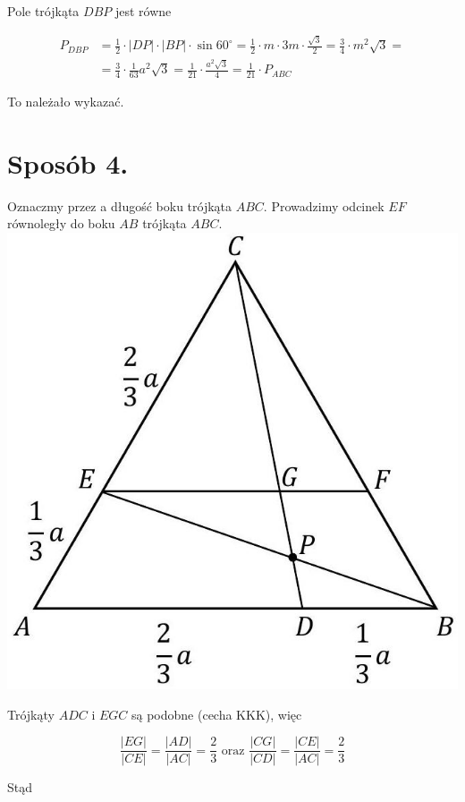 \documentclass[10pt]{article}
\begin{document}
Pole trójkąta $D B P$ jest równe

$$
\begin{aligned}
P_{D B P} & =\frac{1}{2} \cdot|D P| \cdot|B P| \cdot \sin 60^{\circ}=\frac{1}{2} \cdot m \cdot 3 m \cdot \frac{\sqrt{3}}{2}=\frac{3}{4} \cdot m^{2} \sqrt{3}= \\
& =\frac{3}{4} \cdot \frac{1}{63} a^{2} \sqrt{3}=\frac{1}{21} \cdot \frac{a^{2} \sqrt{3}}{4}=\frac{1}{21} \cdot P_{A B C}
\end{aligned}
$$

To należało wykazać.

\section*{Sposób 4.}
Oznaczmy przez a długość boku trójkąta $A B C$. Prowadzimy odcinek $E F$ równoległy do boku $A B$ trójkąta $A B C$.\\
\includegraphics[max width=\textwidth, center]{2025_02_07_36131546116d12814c9cg-14}

Trójkąty $A D C$ i $E G C$ są podobne (cecha KKK), więc

$$
\frac{|E G|}{|C E|}=\frac{|A D|}{|A C|}=\frac{2}{3} \text { oraz } \frac{|C G|}{|C D|}=\frac{|C E|}{|A C|}=\frac{2}{3}
$$

Stąd
\end{document}
